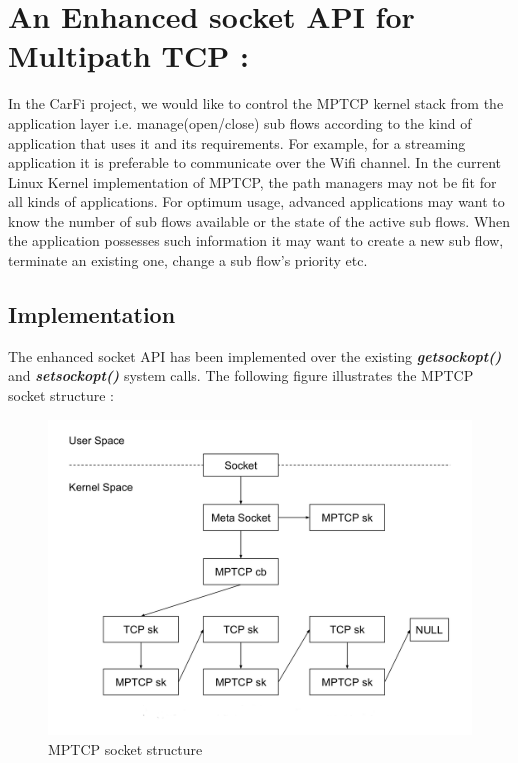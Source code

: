 \documentclass[a4paper,11pt]{article}
\begin{document}
	\section{An Enhanced socket API for Multipath TCP : }

		\label{sec:mptcpapi}
		 In the CarFi project, we would like to control the MPTCP kernel stack from the application layer i.e. manage(open/close) sub flows according to the kind of application that uses it and its requirements. For example, for a streaming application it is preferable to communicate over the Wifi channel. In the current Linux Kernel implementation of MPTCP, the path managers may not be fit for all kinds of applications. For optimum usage, advanced applications may want to know the number of sub flows available or the state of the active sub flows. When the application possesses such information it may want to create a new sub flow, terminate an existing one, change a sub flow's priority etc.

		\subsection{Implementation}
			\label{subsec:implement}
			The enhanced socket API has been implemented over the existing \textbf{\emph{getsockopt()}} and \textbf{\emph{setsockopt()}} system calls. The following figure illustrates the MPTCP socket structure \cite{api}:
			\begin{figure}[h]
			\begin{center}
				\includegraphics[scale=1.5]{pictures/mptcp_socket_structure.jpg}
				\caption[]{MPTCP socket structure}
			\end{center}
			\end{figure}
\end{document}
